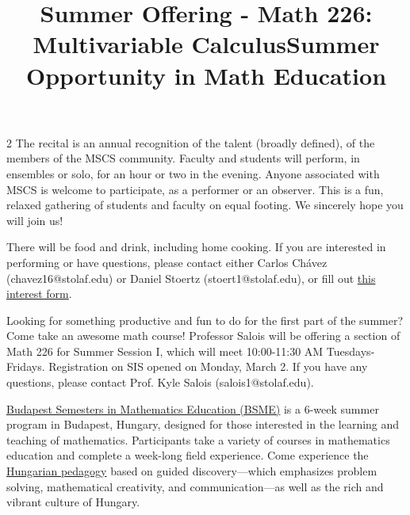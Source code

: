\documentclass[12pt]{article}
\newcommand{\bolder}{\textbf}
\begin{document}
\begin{multicols}{2}
The recital is an annual recognition of the talent (broadly defined), of the members of the MSCS community. Faculty and students will perform, in ensembles or solo, for an hour or two in the evening. Anyone associated with MSCS is welcome to participate, as a performer or an observer. This is a fun, relaxed gathering of students and faculty on equal footing. We sincerely hope you will join us!

There will be food and drink, including home cooking. If you are interested in performing or have questions, please contact either Carlos Chávez (chavez16@stolaf.edu) or Daniel Stoertz (stoert1@stolaf.edu), or fill out \href{https://docs.google.com/forms/d/e/1FAIpQLSctO8sAXxTCjrrDK_F1ocOHFMjC1OTzejShYgvfoWYQjHmg1g/viewform?usp=publish-editor}{this interest form}.


\begin{tcolorbox}[colback=white, colframe=black]
    \begin{center}
    \title{{\large \bolder{Summer Offering - Math 226: Multivariable Calculus}}}
    \end{center}
\end{tcolorbox}
Looking for something productive and fun to do for the first part of the summer?  Come take an awesome math course!  Professor Salois will be offering a section of Math 226 for Summer Session I, which will meet 10:00-11:30 AM Tuesdays-Fridays.  Registration on SIS opened on Monday, March 2.  If you have any questions, please contact Prof. Kyle Salois (salois1@stolaf.edu).  

\begin{tcolorbox}[colback=white, colframe=black]
    \begin{center}
    \title{{\large \bolder{Summer Opportunity in Math Education}}}
    \end{center}
\end{tcolorbox}

\href {https://bsmeducation.com} {Budapest Semesters in Mathematics Education (BSME)} is a 6-week summer program in Budapest, Hungary, designed for those interested in the learning and teaching of mathematics. Participants take a variety of courses in mathematics education and complete a week-long field experience. Come experience the \href{https://bsmeducation.com/wp-content/uploads/2020/02/hungarian-pedagogy-flyer.pdf}{Hungarian pedagogy} based on guided discovery—which emphasizes problem solving, mathematical creativity, and communication—as well as the rich and vibrant culture of Hungary.


\end{multicols}
\end{document}
